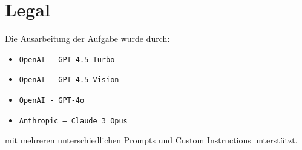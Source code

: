 \documentclass[a4paper,11pt]{report}
\begin{document}
    \newpage

    \chapter{Legal}
    \label{ch:legal}
    Die Ausarbeitung der Aufgabe wurde durch:

    \begin{itemize}
        \item \texttt{OpenAI - GPT-4.5 Turbo}
        \item \texttt{OpenAI - GPT-4.5 Vision}
        \item \texttt{OpenAI - GPT-4o}
        \item \texttt{Anthropic -- Claude 3 Opus}
    \end{itemize}

    mit mehreren unterschiedlichen Prompts und Custom Instructions unterstützt.
\end{document}
